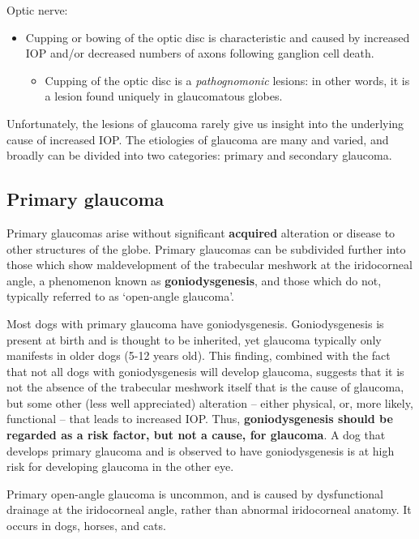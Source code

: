 \documentclass[openany]{book}
\providecommand{\tightlist}{%
  \setlength{\itemsep}{0pt}\setlength{\parskip}{0pt}}
\begin{document}
Optic nerve:

\begin{itemize}
\tightlist
\item
  Cupping or bowing of the optic disc is characteristic and caused by
  increased IOP and/or decreased numbers of axons following ganglion
  cell death.

  \begin{itemize}
  \tightlist
  \item
    Cupping of the optic disc is a \emph{pathognomonic} lesions: in
    other words, it is a lesion found uniquely in glaucomatous globes.
  \end{itemize}
\end{itemize}

Unfortunately, the lesions of glaucoma rarely give us insight into the
underlying cause of increased IOP. The etiologies of glaucoma are many
and varied, and broadly can be divided into two categories: primary and
secondary glaucoma.

\subsection{Primary glaucoma}\label{primary-glaucoma}

Primary glaucomas arise without significant \textbf{acquired} alteration
or disease to other structures of the globe. Primary glaucomas can be
subdivided further into those which show maldevelopment of the
trabecular meshwork at the iridocorneal angle, a phenomenon known as
\textbf{goniodysgenesis}, and those which do not, typically referred to
as `open-angle glaucoma'.

Most dogs with primary glaucoma have goniodysgenesis. Goniodysgenesis is
present at birth and is thought to be inherited, yet glaucoma typically
only manifests in older dogs (5-12 years old). This finding, combined
with the fact that not all dogs with goniodysgenesis will develop
glaucoma, suggests that it is not the absence of the trabecular meshwork
itself that is the cause of glaucoma, but some other (less well
appreciated) alteration -- either physical, or, more likely, functional
-- that leads to increased IOP. Thus, \textbf{goniodysgenesis should be
regarded as a risk factor, but not a cause, for glaucoma}. A dog that
develops primary glaucoma and is observed to have goniodysgenesis is at
high risk for developing glaucoma in the other eye.

Primary open-angle glaucoma is uncommon, and is caused by dysfunctional
drainage at the iridocorneal angle, rather than abnormal iridocorneal
anatomy. It occurs in dogs, horses, and cats.
\end{document}
